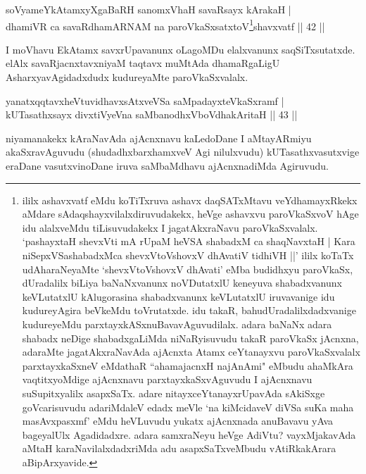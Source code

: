 \begin{shl}
soV\s yameYkAtamxyXgaBaRH sanomxVhaH savaRsayx kArakaH |\\
dhamiVR ca savaRdhamARNAM na paroVkaSxsatxtoV\s \footnote{ililx ashavxvatf eMdu koTiTxruva ashavx daqSATxMtavu veYdhamayxRkekx aMdare sAdaqshayxvilalxdiruvudakekx, heVge ashavxvu paroVkaSxvoV hAge idu alalxveMdu tiLisuvudakekx I jagatAkxraNavu paroVkaSxvalalx. `pashayxtaH shevxVti mA rUpaM heVSA shabadxM ca shaqNavxtaH | Kara niSepxVSashabadxMca shevxVtoV\s shovxV dhAvatiV tidhiVH ||' ililx koTaTx udAharaNeyaMte `shevxVtoV\s shovxV dhAvati' eMba budidhxyu paroVkaSx, dUradalilx biLiya baNaNxvanunx noVDutatxlU keneyuva shabadxvanunx keVLutatxlU kAlugorasina shabadxvanunx keVLutatxlU iruvavanige idu kudureyAgira beVkeMdu toVrutatxde. idu takaR, bahudUradalilxdadxvanige kudureyeMdu parxtayxkASxnuBavavAguvudilalx. adara baNaNx adara shabadx neDige shabadxgaLiMda niNaRyisuvudu takaR paroVkaSx jAcnxna, adaraMte jagatAkxraNavAda ajAcnxta Atamx ceYtanayxvu paroVkaSxvalalx parxtayxkaSxneV eMdathaR ``ahamajacnxH najAnAmi" eMbudu ahaMkAra vaqtitxyoMdige ajAcnxnavu parxtayxkaSxvAguvudu I ajAcnxnavu suSupitxyalilx asapxSaTx. adare nitayxceYtanayxrUpavAda sAkiSxge goVcarisuvudu adariMdaleV edadx meVle `na kiMcidaveV diVSa suKa maha masAvxpasxmf' eMdu heVLuvudu yukatx ajAcnxnada anuBavavu yAva bageyalUlx Agadidadxre. adara samxraNeyu heVge AdiVtu? vayxMjakavAda aMtaH karaNavilalxdadxriMda adu asapxSaTxveMbudu vAtiRkakArara aBipArxyavide.}shavxvatf \hfill || 42 ||
\end{shl}

\begin{artha}
I moVhavu EkAtamx savxrUpavanunx oLagoMDu elalxvanunx saqSiTxsutatxde. elAlx savaRjacnxtavxniyaM taqtavx muMtAda dhamaRgaLigU AsharxyavAgidadxdudx kudureyaMte paroVkaSxvalalx.
\end{artha}

\begin{shl}
yanatxqqtavxheVtuvidhavxsAtxveVSa saMpadayxteV\s kaSxramf |\\
kUTasathxsayx divxtiVyeVna saMbanodhxV\s boVdhakAritaH \hfill || 43 ||
\end{shl}

\begin{artha}%
niyamanakekx kAraNavAda ajAcnxnavu kaLedoDane I aMtayARmiyu akaSxravAguvudu (shudadhxbarxhamxveV Agi nilulxvudu) kUTasathxvasutxvige eraDane vasutxvinoDane iruva saMbaMdhavu ajAcnxnadiMda Agiruvudu.
\end{artha}

